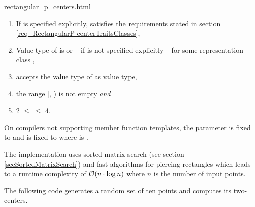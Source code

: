 \begin{ccHtmlClassFile}{rectangular_p_centers.html}
  \begin{enumerate}
  \item If  is specified explicitly,  satisfies the
    requirements stated in section
    \ref{req_RectangularP-centerTraitsClasses},
  \item Value type of  is 
    or -- if  is not specified explicitly --
     for some representation class ,
  \item {} accepts the value type of
     as value type,
  \item the range [, ) is not empty \textit{and}
  \item 2 $\le$  $\le$ 4.
  \end{enumerate}

  
  On compilers not supporting member function templates, the parameter
   is fixed to 
  and  is fixed to
   where  is
  .
  
  \ccImplementation The implementation uses sorted matrix search (see
  section \ref{secSortedMatrixSearch}) and fast algorithms for
  piercing rectangles\cite{sw-rpppp-96} which leads to a runtime
  complexity of ${\cal O}(n \cdot \log n)$ where $n$ is the number of
  input points.
  
  \ccExample The following code generates a random set of ten points
  and computes its two-centers.


\end{ccHtmlClassFile}

